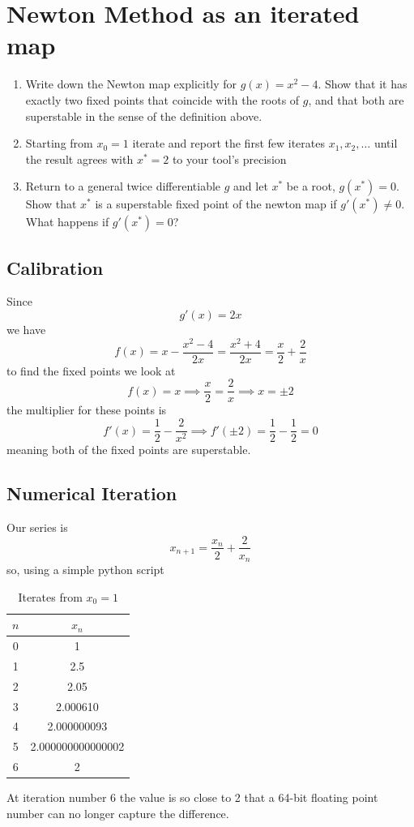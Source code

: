 \clearpage
\section{Newton Method as an iterated map}
\begin{colbox}
    \begin{enumerate}
        \item Write down the Newton map explicitly for \(g(x) = x^2-4\). Show that it has exactly two fixed points that coincide with the roots of \(g\), and that both are superstable in the sense of the definition above.
        \item Starting from \(x_0=1\) iterate and report the first few iterates \(x_1,x_2,\dots\) until the result agrees with \(x^*=2\) to your tool's precision
        \item Return to a general twice differentiable \(g\) and let \(x^*\) be a root, \(g(x^*)=0\). Show that \(x^*\) is a superstable fixed point of the newton map if \(g'(x^*)\neq0\). What happens if \(g'(x^*)=0\)?
    \end{enumerate}
\end{colbox}
\subsection{Calibration}
Since
\begin{equation}
    g'(x) = 2x
\end{equation}
we have 
\begin{equation}
    f(x) = x-\frac{x^2-4}{2x}=\frac{x^2+4}{2x}=\frac{x}{2}+\frac{2}{x}
\end{equation}
to find the fixed points we look at 
\begin{equation}
    f(x)=x \implies \frac{x}{2}=\frac{2}{x} \implies x=\pm2
\end{equation}
the multiplier for these points is 
\begin{equation}
    f'(x) = \frac{1}{2}-\frac{2}{x^2} \implies f'(\pm2)=\frac{1}{2}-\frac{1}{2}=0
\end{equation}
meaning both of the fixed points are superstable.
\subsection{Numerical Iteration}
Our series is 
\begin{equation}
    x_{n+1}=\frac{x_n}{2}+\frac{2}{x_n}
\end{equation}
so, using a simple python script
\begin{table}[!htb]
\centering
\begin{tabular}{c|c}
    \(n\) & \(x_n\) \\\hline
    0 & 1 \\
    1 & 2.5 \\
    2 & 2.05 \\
    3 & 2.000610 \\
    4 & 2.000000093 \\
    5 & 2.000000000000002 \\
    6 & 2
\end{tabular}
\caption{Iterates from \(x_0=1\)}
\end{table}
At iteration number 6 the value is so close to 2 that a 64-bit floating point number can no longer capture the difference.
